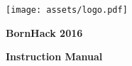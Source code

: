 \documentclass[10pt,a5paper,twoside]{memoir}
\begin{document}
\begin{titlingpage}
\centering

\vspace*{-1.0cm}

\texttt{[image: assets/logo.pdf]}

\vspace*{0.4cm}

\bfseries\Huge{BornHack 2016}

\bfseries\Huge{Instruction Manual}

\end{titlingpage}

\tableofcontents*




\end{document}
